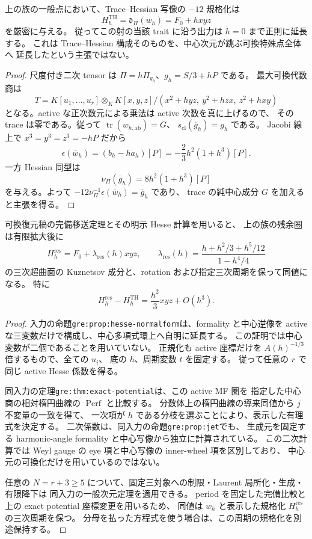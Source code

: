 \begin{proposition}
\label{prop:nfm-th-hesse-exact}
上の族の一般点において、Trace--Hessian 写像の $-12$ 規格化は
\[
 H_h^{\mathrm{TH}}=\mathfrak d_\Pi(w_h)=F_0+hxyz
\]
を厳密に与える。
従ってこの射の当該 trait に沿う出力は $h=0$ まで正則に延長する。
これは Trace--Hessian 構成そのものを、中心次元が跳ぶ可換特殊点全体へ
延長したという主張ではない。
\end{proposition}

\begin{proof}
尺度付き二次 tensor は $\Pi=h\Pi_{g_h}$、$g_h=S/3+hP$ である。
最大可換代数商は
\[
 T=K[u_1,\ldots,u_r]\otimes_K
 K[x,y,z]/(x^2+hyz,\ y^2+hzx,\ z^2+hxy)
\]
となる。active な正次数元による乗法は active 次数を真に上げるので、
その trace は零である。従って $\operatorname{tr}(w_{h,\mathrm{ab}})=G$、
$s_{\mathrm{cl}}(\overline g_h)=g_h$ である。
Jacobi 線上で $x^3=y^3=z^3=-hP$ だから
\[
 \epsilon(\overline w_h)=(b_h-ha_h)[P]
 =-\frac23h^2(1+h^3)[P].
\]
一方 Hessian 同型は
\[
 \nu_\Pi(\overline g_h)=8h^2(1+h^3)[P]
\]
を与える。よって
$-12\nu_\Pi^{-1}\epsilon(\overline w_h)=\overline g_h$ であり、
trace の純中心成分 $G$ を加えると主張を得る。
\end{proof}

\begin{proposition}
\label{prop:nfm-residual-hesse-input}
可換復元稿の完備移送定理とその明示 Hesse 計算を用いると、
上の族の残余圏は有限拡大後に
\[
 H_h^{\mathrm{res}}=F_0+\lambda_{\mathrm{res}}(h)xyz,
 \qquad
 \lambda_{\mathrm{res}}(h)
 =\frac{h+h^2/3+h^5/12}{1-h^4/4}
\]
の三次超曲面の Kuznetsov 成分と、rotation および指定三次周期を保って同値になる。
特に
\[
 H_h^{\mathrm{res}}-H_h^{\mathrm{TH}}
 =\frac{h^2}{3}xyz+O(h^3).
\]
\end{proposition}

\begin{proof}
入力の命題\texttt{gre:prop:hesse-normalform}は、formality と中心逆像を
active な三変数だけで構成し、中心多項式環上へ自明に延長する。
この証明では中心変数が二個であることを用いていない。
正規化も active 座標だけを $A(h)^{-1/3}$ 倍するもので、全ての $u_i$、
底の $h$、周期変数 $t$ を固定する。
従って任意の $r$ で同じ active Hesse 係数を得る。

同入力の定理\texttt{gre:thm:exact-potential}は、この active MF 圏を
指定した中心商の相対楕円曲線の $\operatorname{Perf}$ と比較する。
分数体上の楕円曲線の導来同値から $j$ 不変量の一致を得て、
一次項が $h$ である分枝を選ぶことにより、表示した有理式を決定する。
二次係数は、同入力の命題\texttt{gre:prop:jet}でも、
生成元を固定する harmonic-angle formality と中心写像から独立に計算されている。
この二次計算では Weyl gauge の eye 項と中心写像の inner-wheel 項を区別しており、
中心元の可換化だけを用いているのではない。

任意の $N=r+3\ge5$ について、固定三対象への制限・Laurent 局所化・生成・有限降下は
同入力の一般次元定理を適用できる。
period を固定した完備比較と上の exact potential 座標変更を用いるため、
同値は $w_h$ と表示した規格化 $H_h^{\mathrm{res}}$ の三次周期を保つ。
分母を払った方程式を使う場合は、この周期の規格化を別途保持する。
\end{proof}

